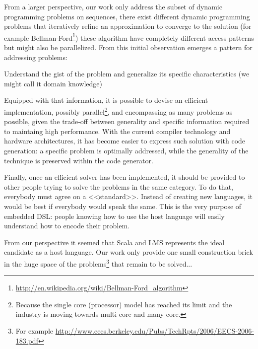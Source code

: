 From a larger perspective, our work only address the subset of dynamic programming problems on sequences, there exist different dynamic programming problems that iteratively refine an approximation to converge to the solution (for example Bellman-Ford\footnote{\url{http://en.wikipedia.org/wiki/Bellman-Ford_algorithm}}) these algorithm have completely different access patterns but might also be parallelized. From this initial observation emerges a pattern for addressing problems:\ol
\item Understand the gist of the problem and generalize its specific characteristics (we might call it domain knowledge)
\item Equipped with that information, it is possible to devise an efficient implementation, possibly parallel\footnote{Because the single core (processor) model has reached its limit and the industry is moving towards multi-core and many-core.}, and encompassing as many problems as possible, given the trade-off between generality and specific information required to maintaing high performance. With the current compiler technology and hardware architectures, it has become easier to express such solution with code generation: a specific problem is optimally addressed, while the generality of the technique is preserved within the code generator.
\item Finally, once an efficient solver has been implemented, it should be provided to other people trying to solve the problems in the same category. To do that, everybody must agree on a <<standard>>. Instead of creating new languages, it would be best if everybody would speak the same. This is the very purpose of embedded DSL: people knowing how to use the host language will easily understand how to encode their problem.
\ole

From our perspective it seemed that Scala and LMS represents the ideal candidate as a host language. Our work only provide one small construction brick in the huge space of the problems\footnote{For example \url{http://www.eecs.berkeley.edu/Pubs/TechRpts/2006/EECS-2006-183.pdf}} that remain to be solved...

%
